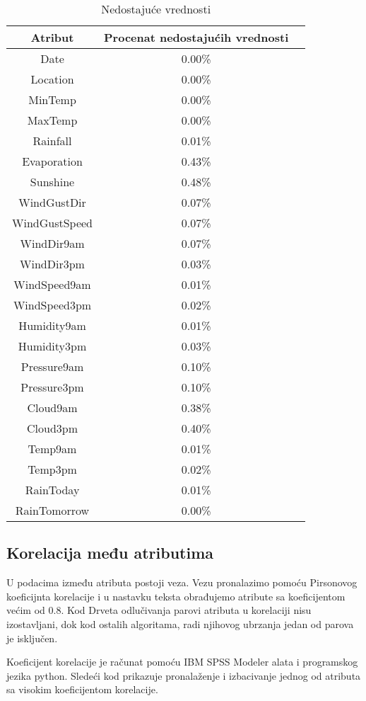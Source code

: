 \documentclass[a4paper]{article}
\begin{document}
\begin{table}[h]
\begin{center}
\caption{Nedostajuće vrednosti}
\label{tab:nans}
\begin{tabular}{|c|c|c|} \hline
\textbf{Atribut} & \textbf{Procenat nedostajućih vrednosti}\\ \hline
Date & 0.00\% \\ \hline
Location & 0.00\% \\ \hline
MinTemp & 0.00\% \\ \hline
MaxTemp & 0.00\% \\ \hline
Rainfall & 0.01\% \\ \hline
Evaporation & 0.43\% \\ \hline
Sunshine & 0.48\% \\ \hline
WindGustDir & 0.07\% \\ \hline
WindGustSpeed & 0.07\% \\ \hline
WindDir9am & 0.07\% \\ \hline
WindDir3pm & 0.03\% \\ \hline
WindSpeed9am & 0.01\% \\ \hline
WindSpeed3pm & 0.02\% \\ \hline
Humidity9am & 0.01\% \\ \hline
Humidity3pm & 0.03\% \\ \hline
Pressure9am & 0.10\% \\ \hline
Pressure3pm & 0.10\% \\ \hline
Cloud9am & 0.38\% \\ \hline
Cloud3pm & 0.40\% \\ \hline
Temp9am & 0.01\% \\ \hline
Temp3pm & 0.02\% \\ \hline
RainToday & 0.01\% \\ \hline
RainTomorrow & 0.00\% \\ \hline
\end{tabular}
\end{center}
\end{table}

\subsection{Korelacija među atributima}
\label{subsec:korelacija}
U podacima između atributa postoji veza. Vezu pronalazimo pomoću Pirsonovog koeficijnta korelacije i u nastavku teksta obrađujemo atribute sa koeficijentom većim od 0.8. Kod Drveta odlučivanja parovi atributa u korelaciji nisu izostavljani, dok kod ostalih algoritama, radi njihovog  ubrzanja jedan od parova je isključen. \par
Koeficijent korelacije je računat pomoću IBM SPSS Modeler alata i programskog jezika python. Sledeći kod prikazuje pronalaženje i izbacivanje jednog od atributa sa visokim koeficijentom korelacije.\par

\end{document}
